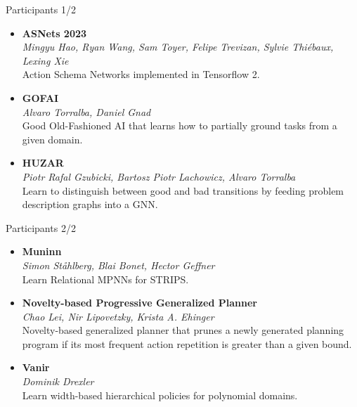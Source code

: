 \documentclass[aspectratio=169,xcolor=dvipsnames]{beamer}
\begin{document}
\begin{frame}{Participants 1/2}
\begin{itemize}
\item
    \textbf{ASNets 2023}\\
    \emph{Mingyu Hao, Ryan Wang, Sam Toyer, Felipe Trevizan, Sylvie
    Thiébaux, Lexing Xie}\\
    Action Schema Networks implemented in Tensorflow 2.
\item
    \textbf{GOFAI}\\
    \emph{Alvaro Torralba, Daniel Gnad}\\
    Good Old-Fashioned AI that learns
    how to partially ground tasks from a given domain.
\item
    \textbf{HUZAR}\\
    \emph{Piotr Rafal Gzubicki, Bartosz Piotr Lachowicz, Alvaro Torralba}\\
    Learn to distinguish between good and bad transitions by feeding
    problem description graphs into a GNN.
\end{itemize}
\end{frame}

\begin{frame}{Participants 2/2}
\begin{itemize}
\item
    \textbf{Muninn}\\
    \emph{Simon Ståhlberg, Blai Bonet, Hector Geffner}\\
    Learn Relational MPNNs for STRIPS.
\item
    \textbf{Novelty-based Progressive Generalized Planner}\\
    \emph{Chao Lei, Nir Lipovetzky, Krista A. Ehinger}\\
    Novelty-based generalized planner that
    prunes a newly generated planning program if its most frequent action
    repetition is greater than a given bound.
\item
    \textbf{Vanir}\\
    \emph{Dominik Drexler}\\
    Learn width-based hierarchical policies for
    polynomial domains.
\end{itemize}
\end{frame}
\end{document}
